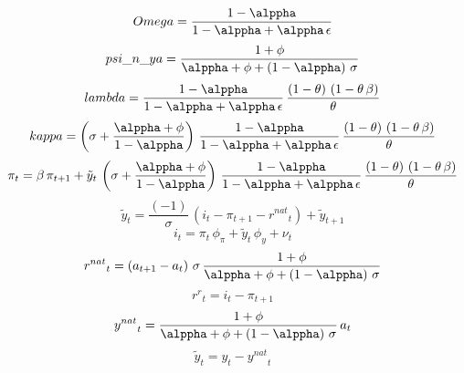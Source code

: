 \begin{dmath*}
Omega = \frac{1-{{\alppha}}}{1-{{\alppha}}+{{\alppha}}\, {{\epsilon}}}
\end{dmath*}
\begin{dmath*}
psi\_n\_ya = \frac{1+{{\phi}}}{{{\alppha}}+{{\phi}}+\left(1-{{\alppha}}\right)\, {{\sigma}}}
\end{dmath*}
\begin{dmath*}
lambda = \frac{1-{{\alppha}}}{1-{{\alppha}}+{{\alppha}}\, {{\epsilon}}}\, \frac{\left(1-{{\theta}}\right)\, \left(1-{{\theta}}\, {{\beta}}\right)}{{{\theta}}}
\end{dmath*}
\begin{dmath*}
kappa = \left({{\sigma}}+\frac{{{\alppha}}+{{\phi}}}{1-{{\alppha}}}\right)\, \frac{1-{{\alppha}}}{1-{{\alppha}}+{{\alppha}}\, {{\epsilon}}}\, \frac{\left(1-{{\theta}}\right)\, \left(1-{{\theta}}\, {{\beta}}\right)}{{{\theta}}}
\end{dmath*}
\begin{dmath}
{{\pi}}_{t}={{\beta}}\, {{\pi}}_{t+1}+{{\tilde y}}_{t}\, \left({{\sigma}}+\frac{{{\alppha}}+{{\phi}}}{1-{{\alppha}}}\right)\, \frac{1-{{\alppha}}}{1-{{\alppha}}+{{\alppha}}\, {{\epsilon}}}\, \frac{\left(1-{{\theta}}\right)\, \left(1-{{\theta}}\, {{\beta}}\right)}{{{\theta}}}
\end{dmath}
\begin{dmath}
{{\tilde y}}_{t}=\frac{\left(-1\right)}{{{\sigma}}}\, \left({{i}}_{t}-{{\pi}}_{t+1}-{{r^{nat}}}_{t}\right)+{{\tilde y}}_{t+1}
\end{dmath}
\begin{dmath}
{{i}}_{t}={{\pi}}_{t}\, {{\phi_{\pi}}}+{{\tilde y}}_{t}\, {{\phi_{y}}}+{{\nu}}_{t}
\end{dmath}
\begin{dmath}
{{r^{nat}}}_{t}=\left({{a}}_{t+1}-{{a}}_{t}\right)\, {{\sigma}}\, \frac{1+{{\phi}}}{{{\alppha}}+{{\phi}}+\left(1-{{\alppha}}\right)\, {{\sigma}}}
\end{dmath}
\begin{dmath}
{{r^r}}_{t}={{i}}_{t}-{{\pi}}_{t+1}
\end{dmath}
\begin{dmath}
{{y^{nat}}}_{t}=\frac{1+{{\phi}}}{{{\alppha}}+{{\phi}}+\left(1-{{\alppha}}\right)\, {{\sigma}}}\, {{a}}_{t}
\end{dmath}
\begin{dmath}
{{\tilde y}}_{t}={{y}}_{t}-{{y^{nat}}}_{t}
\end{dmath}
